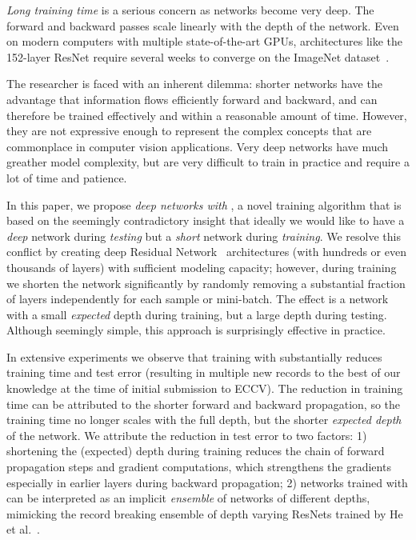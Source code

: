 \documentclass[runningheads]{llncs}
\begin{document}
\emph{Long training time} is a serious concern as networks become very deep. The forward and backward passes scale linearly with the depth of the network. Even on modern computers with multiple state-of-the-art GPUs, architectures like the 152-layer ResNet require several weeks to converge on the ImageNet dataset~\cite{he2015deep}.

The researcher is faced with an inherent dilemma:
shorter networks have the advantage that information flows efficiently forward and backward, and can therefore be trained effectively and within a reasonable amount of time. However, they are not expressive enough to represent the complex concepts that are commonplace in computer vision applications. Very deep networks have much greather model complexity, but are very difficult to train in practice and require a lot of time and patience.

In this paper, we propose \emph{deep networks with \name{}}, a novel training algorithm that is based on the seemingly contradictory insight that ideally we would like to have a \emph{deep} network during \emph{testing} but a \emph{short} network during \emph{training}. We resolve this conflict by creating deep Residual Network~\cite{he2015deep} architectures (with hundreds or even thousands of layers) with sufficient modeling capacity; however, during training  we shorten the network significantly by randomly removing a substantial fraction of layers independently for each sample or mini-batch.
The effect is a network with a small \emph{expected} depth during training, but a large depth during testing. Although seemingly simple, this approach is surprisingly effective in practice.

In extensive experiments we observe that training with \name{} substantially reduces training time and test error (resulting in multiple new records to the best of our knowledge at the time of initial submission to ECCV).
The reduction in training time can be attributed to the shorter forward and backward propagation, so the training time no longer scales with the full depth, but the shorter \emph{expected depth} of the network. We attribute the reduction in test error to two factors: 1) shortening the (expected) depth during training reduces the chain of forward propagation steps and gradient computations, which strengthens the gradients especially in earlier layers during backward propagation; 2) networks trained with \name{} can be interpreted as an implicit \emph{ensemble} of networks of different depths, mimicking the record breaking ensemble of depth varying ResNets trained by He et al.~\cite{he2015deep}.
\end{document}

